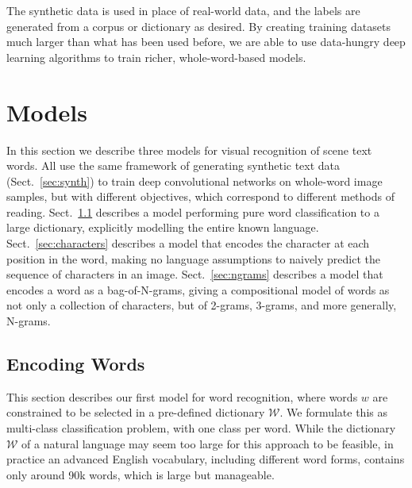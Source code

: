 \documentclass{article} \usepackage{nips14submit_e,times}
\newcommand{\sref}[1]{Sect.~\ref{#1}}
\newcommand{\dict}{\mathcal{W}}
\begin{document}
The synthetic data is used in place of real-world data, and the labels are generated from a corpus or dictionary as desired. By creating training datasets much larger than what has been used before, we are able to use data-hungry deep learning algorithms to train richer, whole-word-based models.

\section{Models}\label{sec:architectures}


In this section we describe three models for visual recognition of scene text words.
All use the same framework of generating synthetic text data (\sref{sec:synth}) to train deep convolutional networks on whole-word image samples, but with different objectives, which correspond to different methods of reading. \sref{sec:dictionary} describes a model performing pure word classification to a large dictionary, explicitly modelling the entire known language. \sref{sec:characters} describes a model that encodes the character at each position in the word, making no language assumptions to naively predict the sequence of characters in an image. \sref{sec:ngrams} describes a model that encodes a word as a bag-of-N-grams, giving a compositional model of words as not only a collection of characters, but of 2-grams, 3-grams, and more generally, N-grams. 

\subsection{Encoding Words}\label{sec:dictionary}
This section describes our first model for word recognition, where words $w$ are constrained to be selected in a pre-defined dictionary $\dict$. We formulate this as multi-class classification problem, with one class per word. While the dictionary $\dict$ of a natural language may seem too large for this approach to be feasible, in practice an advanced English vocabulary, including different word forms, contains only around 90k words, which is large but manageable.
\end{document}
